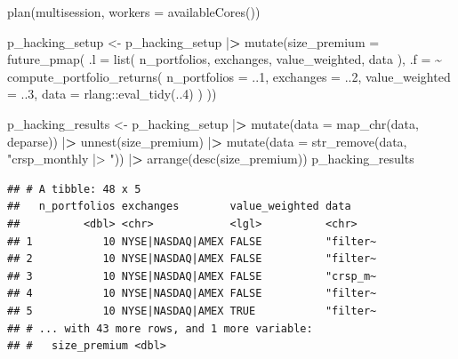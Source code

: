 \documentclass[
]{book}
\newenvironment{Shaded}{\begin{snugshade}}{\end{snugshade}}
\newcommand{\AttributeTok}[1]{\textcolor[rgb]{0.61,0.61,0.61}{#1}}
\newcommand{\DecValTok}[1]{\textcolor[rgb]{0.06,0.06,0.06}{#1}}
\newcommand{\ErrorTok}[1]{\textcolor[rgb]{0.14,0.14,0.14}{\textbf{#1}}}
\newcommand{\FunctionTok}[1]{\textcolor[rgb]{0,0,0}{#1}}
\newcommand{\NormalTok}[1]{#1}
\newcommand{\OtherTok}[1]{\textcolor[rgb]{0.37,0.37,0.37}{#1}}
\newcommand{\SpecialCharTok}[1]{\textcolor[rgb]{0,0,0}{#1}}
\newcommand{\StringTok}[1]{\textcolor[rgb]{0.5,0.5,0.5}{#1}}
\begin{document}
\begin{Shaded}
\begin{Highlighting}[]
\FunctionTok{plan}\NormalTok{(multisession, }\AttributeTok{workers =} \FunctionTok{availableCores}\NormalTok{())}

\NormalTok{p\_hacking\_setup }\OtherTok{\textless{}{-}}\NormalTok{ p\_hacking\_setup }\SpecialCharTok{|}\ErrorTok{\textgreater{}}
  \FunctionTok{mutate}\NormalTok{(}\AttributeTok{size\_premium =} \FunctionTok{future\_pmap}\NormalTok{(}
    \AttributeTok{.l =} \FunctionTok{list}\NormalTok{(}
\NormalTok{      n\_portfolios,}
\NormalTok{      exchanges,}
\NormalTok{      value\_weighted,}
\NormalTok{      data}
\NormalTok{    ),}
    \AttributeTok{.f =} \SpecialCharTok{\textasciitilde{}} \FunctionTok{compute\_portfolio\_returns}\NormalTok{(}
      \AttributeTok{n\_portfolios =}\NormalTok{ ..}\DecValTok{1}\NormalTok{,}
      \AttributeTok{exchanges =}\NormalTok{ ..}\DecValTok{2}\NormalTok{,}
      \AttributeTok{value\_weighted =}\NormalTok{ ..}\DecValTok{3}\NormalTok{,}
      \AttributeTok{data =}\NormalTok{ rlang}\SpecialCharTok{::}\FunctionTok{eval\_tidy}\NormalTok{(..}\DecValTok{4}\NormalTok{)}
\NormalTok{    )}
\NormalTok{  ))}

\NormalTok{p\_hacking\_results }\OtherTok{\textless{}{-}}\NormalTok{ p\_hacking\_setup }\SpecialCharTok{|}\ErrorTok{\textgreater{}}
  \FunctionTok{mutate}\NormalTok{(}\AttributeTok{data =} \FunctionTok{map\_chr}\NormalTok{(data, deparse)) }\SpecialCharTok{|}\ErrorTok{\textgreater{}}
  \FunctionTok{unnest}\NormalTok{(size\_premium) }\SpecialCharTok{|}\ErrorTok{\textgreater{}}
  \FunctionTok{mutate}\NormalTok{(}\AttributeTok{data =} \FunctionTok{str\_remove}\NormalTok{(data, }\StringTok{"crsp\_monthly |\textgreater{} "}\NormalTok{)) }\SpecialCharTok{|}\ErrorTok{\textgreater{}}
  \FunctionTok{arrange}\NormalTok{(}\FunctionTok{desc}\NormalTok{(size\_premium))}
\NormalTok{p\_hacking\_results}
\end{Highlighting}
\end{Shaded}

\begin{verbatim}
## # A tibble: 48 x 5
##   n_portfolios exchanges        value_weighted data    
##          <dbl> <chr>            <lgl>          <chr>   
## 1           10 NYSE|NASDAQ|AMEX FALSE          "filter~
## 2           10 NYSE|NASDAQ|AMEX FALSE          "filter~
## 3           10 NYSE|NASDAQ|AMEX FALSE          "crsp_m~
## 4           10 NYSE|NASDAQ|AMEX FALSE          "filter~
## 5           10 NYSE|NASDAQ|AMEX TRUE           "filter~
## # ... with 43 more rows, and 1 more variable:
## #   size_premium <dbl>
\end{verbatim}
\end{document}
